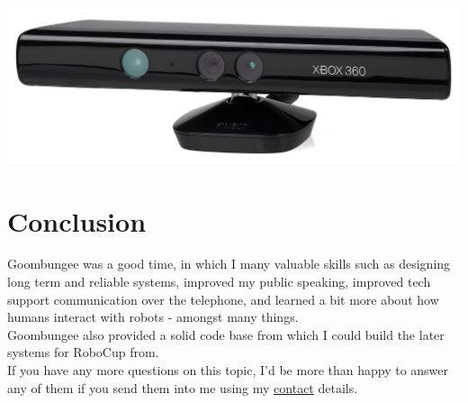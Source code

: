 		\centerline{\includegraphics[width=0.75\linewidth]{images/kinect}}
		
	\section{Conclusion}
		Goombungee was a good time, in which I  many valuable skills such as designing long term and reliable systems, improved my public speaking, improved tech support communication over the telephone,  and learned a bit more about how humans interact with robots - amongst many things.\\
		
		Goombungee also provided a solid code base from which I could build the later systems for RoboCup from.\\
		
		If you have any more questions on this topic, I'd be more than happy to answer any of them if you send them into me using my \hyperref[contact]{contact} details.\\
                